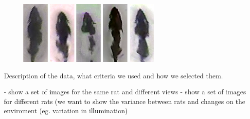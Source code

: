 \documentclass[conference]{IEEEtran}
\begin{document}
\begin{figure}[h]
\includegraphics[scale=0.9]{dataset/1.png}
\includegraphics[scale=0.9]{dataset/3.png}
\includegraphics[scale=0.9]{dataset/4.png}
\includegraphics[scale=0.9]{dataset/5.png}
\includegraphics[scale=0.9]{dataset/7.png}
\end{figure}



Description of the data, what criteria we used and how we selected them.

- show a set of images for the same rat and different views
- show a set of images for different rats (we want to show the variance between rats and changes on the enviroment (eg. variation in illumination)
\end{document}
